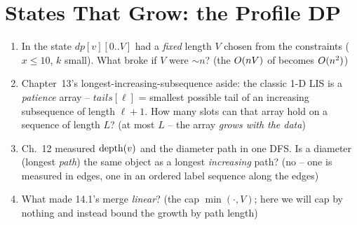 \section{States That Grow: the Profile DP}\label{sec:c27-growing}

\begin{previouslybox}
\begin{enumerate}[nosep, leftmargin=1.6em]
  \item In  the state $\mathit{dp}[v][0..V]$ had a
        \emph{fixed} length $V$ chosen from the constraints ($x\le10$, $k$ small).
        What broke if $V$ were $\sim n$? (the $O(nV)$ of
         becomes $O(n^2)$)
  \item Chapter~13's longest-increasing-subsequence aside: the classic 1-D LIS
        is a \emph{patience} array -- $\mathit{tails}[\ell]$ = smallest possible
        tail of an increasing subsequence of length $\ell{+}1$. How many slots
        can that array hold on a sequence of length $L$? (at most $L$ -- the
        array \emph{grows with the data})
  \item Ch.~12 measured $\operatorname{depth}(v)$ and the diameter path in one DFS. Is a
        diameter (longest \emph{path}) the same object as a longest
        \emph{increasing} path? (no -- one is measured in edges, one in an
        ordered label sequence along the edges)
  \item What made 14.1's merge \emph{linear}? (the cap $\min(\cdot,V)$; here we
        will cap by nothing and instead bound the growth by path length)
\end{enumerate}
\end{previouslybox}


